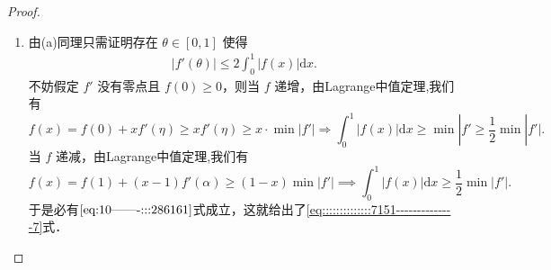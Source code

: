 \documentclass[../../main.tex]{subfiles}
\begin{document}
\begin{proof}
\begin{enumerate}[(1)]
\item 由(a)同理只需证明存在 \( \theta \in [0,1] \) 使得
\begin{align}
|f'(\theta)| \leqslant 2 \int_0^1 |f(x)| \mathrm{d}x. \label{eq:10-------:::286161}
\end{align}
不妨假定 \( f' \) 没有零点且 \( f(0) \geqslant 0 \)，则当 \( f \) 递增，由Lagrange中值定理,我们有
\[
f(x)=f(0)+xf' (\eta )\geqslant xf' (\eta )\geqslant x\cdot \min |f' |\Longrightarrow \int_0^1{|f(x)|\mathrm{d}x}\geqslant \min |f' \geqslant \frac{1}{2}\min |f' |.
\]
当 \( f \) 递减，由Lagrange中值定理,我们有
\[
f(x) = f(1) + (x - 1) f'(\alpha) \geqslant (1 - x) \min |f'| \implies \int_0^1 |f(x)| \mathrm{d}x \geqslant \frac{1}{2} \min |f'|.
\]
于是必有\(\eqref{eq:10-------:::286161}\)式成立，这就给出了\eqref{eq::::::::::::::7151--------------7}式．
\end{enumerate}

\end{proof}
\end{document}

